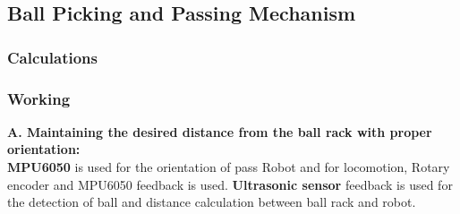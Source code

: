 



    \subsection{Ball Picking and Passing Mechanism}
        \subsubsection{Calculations}


        \subsubsection{Working}
            \textbf{A. Maintaining the desired distance from the ball rack with proper orientation:}                                   \\
            \textbf{MPU6050} is used for the orientation of pass Robot and for locomotion, Rotary encoder and MPU6050 feedback is used. \textbf{Ultrasonic sensor} 
            feedback is used for the detection of ball and distance calculation between ball rack and robot.                                                                                                                     \\


